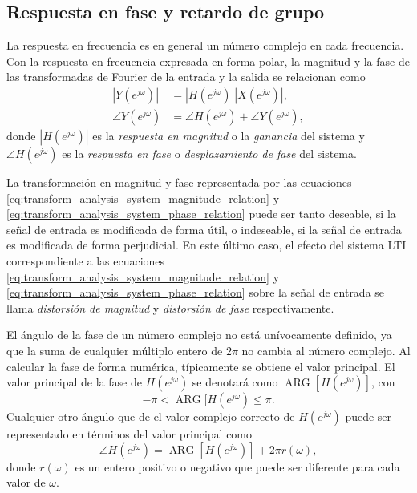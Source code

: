 \documentclass[a4paper]{report}
\DeclareMathOperator{\ARG}{ARG}
\begin{document}
\subsection{Respuesta en fase y retardo de grupo}

La respuesta en frecuencia es en general un número complejo en cada frecuencia. Con la respuesta en frecuencia expresada en forma polar, la magnitud y la fase de las transformadas de Fourier de la entrada y la salida se relacionan como
\begin{align}
 |Y(e^{j\omega})|&=|H(e^{j\omega})||X(e^{j\omega})|,\label{eq:transform_analysis_system_magnitude_relation}\\
 \angle Y(e^{j\omega})&=\angle H(e^{j\omega})+\angle Y(e^{j\omega}),\label{eq:transform_analysis_system_phase_relation}
\end{align}
donde \(|H(e^{j\omega})|\) es la \emph{respuesta en magnitud} o la \emph{ganancia} del sistema y \(\angle H(e^{j\omega})\) es la \emph{respuesta en fase} o \emph{desplazamiento de fase} del sistema.

La transformación en magnitud y fase representada por las ecuaciones  \ref{eq:transform_analysis_system_magnitude_relation} y \ref{eq:transform_analysis_system_phase_relation} puede ser tanto deseable, si la señal de entrada es modificada de forma útil, o indeseable, si la señal de entrada es modificada de forma perjudicial. En este último caso, el efecto del sistema LTI correspondiente a las ecuaciones  \ref{eq:transform_analysis_system_magnitude_relation} y \ref{eq:transform_analysis_system_phase_relation} sobre la señal de entrada se llama \emph{distorsión de magnitud} y \emph{distorsión de fase} respectivamente.

El ángulo de la fase de un número complejo no está unívocamente definido, ya que la suma de cualquier múltiplo entero de \(2\pi\) no cambia al número complejo. Al calcular la fase de forma numérica, típicamente se obtiene el valor principal. El valor principal de la fase de \(H(e^{j\omega})\) se denotará como \(\ARG[H(e^{j\omega})]\), con 
\[
 -\pi<\ARG[H(e^{j\omega})\leq\pi.
\]
Cualquier otro ángulo que de el valor complejo correcto de \(H(e^{j\omega})\) puede ser representado en términos del valor principal como
\[
 \angle H(e^{j\omega})=\ARG[H(e^{j\omega})]+2\pi r(\omega),
\]
donde \(r(\omega)\) es un entero positivo o negativo que puede ser diferente para cada valor de \(\omega\). 
\end{document}
